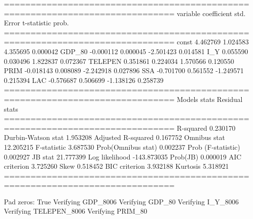 ==============================================================================
variable     coefficient     std. Error      t-statistic     prob.
==============================================================================
const           4.462769      1.024583      4.355695      0.000042
GDP_80          -0.000112      0.000045     -2.501423      0.014581
I_Y             0.055590      0.030496      1.822837      0.072367
TELEPEN           0.351861      0.224034      1.570566      0.120550
PRIM           -0.018143      0.008089     -2.242918      0.027896
SSA            -0.701700      0.561552     -1.249571      0.215394
LAC            -0.576687      0.506699     -1.138126      0.258739
==============================================================================
Models stats                         Residual stats
==============================================================================
R-squared             0.230170         Durbin-Watson stat   1.953208
Adjusted R-squared    0.167752         Omnibus stat         12.205215
F-statistic           3.687530         Prob(Omnibus stat)   0.002237
Prob (F-statistic)    0.002927                  JB stat              21.777399
Log likelihood       -143.873035                        Prob(JB)
0.000019
AIC criterion         3.725260         Skew                 0.518452
BIC criterion         3.932188         Kurtosis             5.318921
==============================================================================


Pad zeros:  True
Verifying GDP_8006
Verifying GDP_80
Verifying I_Y_8006
Verifying TELEPEN_8006
Verifying PRIM_80

